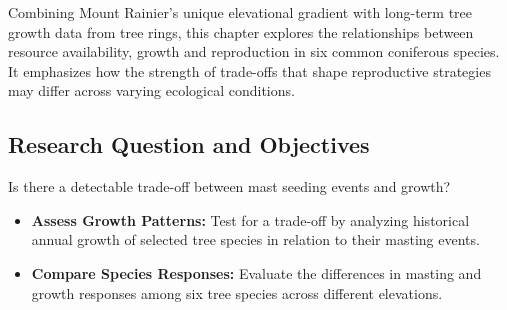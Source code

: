 \documentclass[11pt,letter]{article}
\begin{document}
Combining Mount Rainier's unique elevational gradient with long-term tree growth data from tree rings, this chapter explores the relationships between resource availability, growth and reproduction in six common coniferous species. It emphasizes how the strength of trade-offs that shape reproductive strategies may differ across varying ecological conditions.\par
\subsection{Research Question and Objectives}
Is there a detectable trade-off between mast seeding events and growth?
	\begin{itemize}
	\item \textbf{Assess Growth Patterns:} Test for a trade-off by analyzing historical annual growth of selected tree species in relation to their masting events.
	\item \textbf{Compare Species Responses:} Evaluate the differences in masting and growth responses among six tree species across different elevations.
	\end{itemize}
\end{document}
